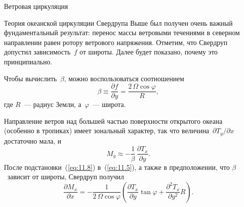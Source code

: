 \begin{chapter}{Ветровая циркуляция}
\begin{section}{Теория океанской циркуляции Свердрупа}
Выше был получен очень важный фундаментальный результат: перенос массы 
ветровыми течениями в северном 
направлении равен ротору ветрового
напряжения. Отметим, что Свердруп допустил зависимость~$f$ от широты. Далее
будет показано, почему это принципиально.
%

Чтобы вычислить~$\beta $, можно воспользоваться соотношением
\begin{equation}\label{eq:11.7}
\beta \equiv \frac{\partial{f}}{\partial{y}} 
  = \frac{2\,\Omega\cos\varphi}{R},
\end{equation}
где $R$~--- радиус Земли, а~$\varphi$~--- широта.
%

Направление ветров над большей частью поверхности открытого океана 
(особенно в тропиках) имеет зональный характер, так что
величина~$\partial{T_y}/\partial{x}$ достаточно мала, и
\begin{equation}\label{eq:11.8}
 M_y \approx -\frac{1}{\beta}\,\frac{\partial T_x}{\partial y}.
\end{equation}
После подстановки~(\ref{eq:11.8}) в~(\ref{eq:11.5}), а также в предположении,
что $\beta$~зависит от широты, Свердруп получил
\begin{equation}
\frac{\partial{M_x}}{\partial{x}}
  =-\frac{1}{2\,\Omega\cos\varphi}
    \left(\frac{\partial{T_x}}{\partial{y}}\tan\varphi 
      + \frac{\partial^2{T_x}}{\partial{y}^2}R \right).
\end{equation}
%


\end{section}
\end{chapter}
